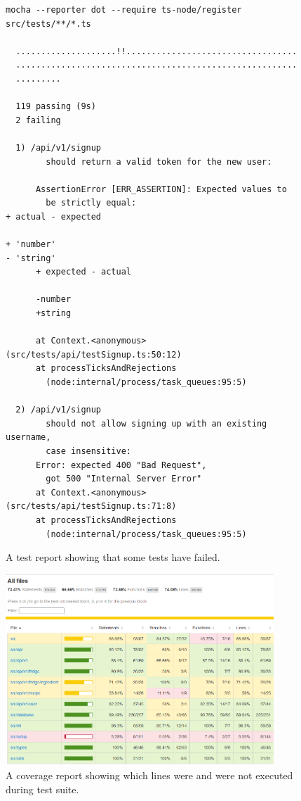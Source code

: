 \begin{figure}
  \centering
  \caption{\label{fig:test_report}A test report showing that some tests have failed.}
  \begin{verbatim}
mocha --reporter dot --require ts-node/register src/tests/**/*.ts

  ....................!!..................................
  ........................................................
  .........

  119 passing (9s)
  2 failing

  1) /api/v1/signup
        should return a valid token for the new user:

      AssertionError [ERR_ASSERTION]: Expected values to
        be strictly equal:
+ actual - expected

+ 'number'
- 'string'
      + expected - actual

      -number
      +string

      at Context.<anonymous> (src/tests/api/testSignup.ts:50:12)
      at processTicksAndRejections
        (node:internal/process/task_queues:95:5)

  2) /api/v1/signup
        should not allow signing up with an existing username,
        case insensitive:
      Error: expected 400 "Bad Request",
        got 500 "Internal Server Error"
      at Context.<anonymous> (src/tests/api/testSignup.ts:71:8)
      at processTicksAndRejections
        (node:internal/process/task_queues:95:5)
  \end{verbatim}
\end{figure}

\begin{figure}
  \centering
  \caption{\label{fig:coverage_report}A coverage report showing which lines were and were not executed during test suite.}
  \includegraphics[width=0.9\textwidth]{figures/coverage_report.png}
\end{figure}

